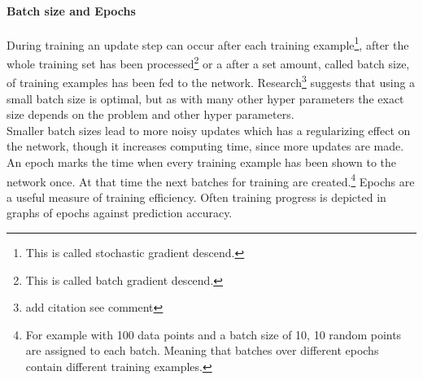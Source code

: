 			\paragraph{Batch size and Epochs}
				During training an update step can occur after each training example\footnote{This is called stochastic gradient descend.}, after the whole training set has been processed\footnote{This is called batch gradient descend.} or a after a set amount, called batch size, of training examples has been fed to the network. Research\footnote{add citation see comment} suggests that using a small batch size is optimal, but as with many other hyper parameters the exact size depends on the problem and other hyper parameters.\\
				Smaller batch sizes lead to more noisy updates which has a regularizing effect on the network, though it increases computing time, since more updates are made.\\
				An epoch marks the time when every training example has been shown to the network once. At that time the next batches for training are created.\footnote{For example with 100 data points and a batch size of 10, 10 random points are assigned to each batch. Meaning that batches over different epochs contain different training examples.} Epochs are a useful measure of training efficiency. Often training progress is depicted in graphs of epochs against prediction accuracy.
			

